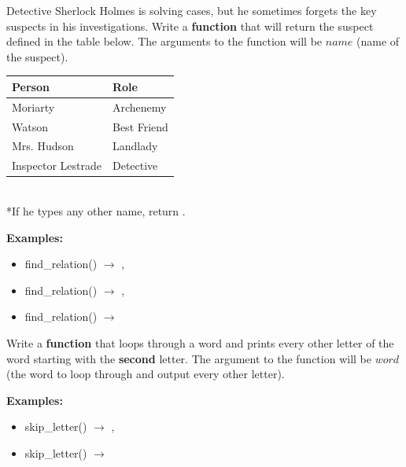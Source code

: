 	\item 
		Detective Sherlock Holmes is solving cases, but he sometimes forgets the key suspects in his investigations. 
		Write a \textbf{function} that will return the suspect defined in the table below.
		The arguments to the function will be $name$ (name of the suspect).\\ 
		\begin{center}
		\begin{tabular}{|l|l|} \hline
			Person 		& Role \\ \hline \hline
			Moriarty	& Archenemy \\ \hline
			Watson		& Best Friend \\ \hline
			Mrs. Hudson			& Landlady \\ \hline
			Inspector Lestrade		& Detective \\ \hline
		\end{tabular}\\ \hspace*{1in} *If he types any other name, return .
		\end{center}
		\textbf{Examples:}		
		\begin{itemize}
			\item  find\_relation() $\rightarrow$ , 
			\item  find\_relation() $\rightarrow$ , 
			\item  find\_relation() $\rightarrow$ 
		\end{itemize}



	\item 
		Write a \textbf{function} that loops through a word and prints every other letter of the word starting with the \textbf{second} letter.
		The argument to the function will be $word$ (the word to loop through and output every other letter).

		\textbf{Examples:}		
		\begin{itemize}
			\item  skip\_letter() $\rightarrow$ , 
			\item  skip\_letter() $\rightarrow$ 
		\end{itemize}

